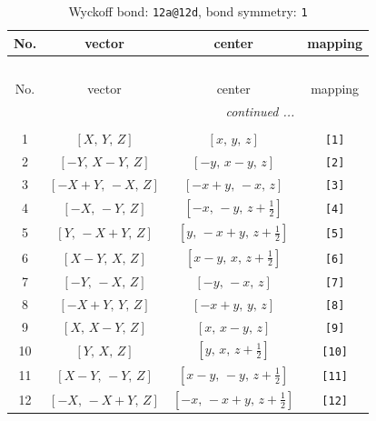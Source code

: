 \documentclass[fleqn,8pt]{jsarticle}
\begin{document}
\renewcommand{\arraystretch}{1.2}
\begin{longtable}{cccc}
\caption{Wyckoff bond: {\tt 12a@12d}, bond symmetry: {\tt 1}}
 \\
 \hline \hline
No. & vector & center & mapping \\ \hline \endfirsthead

\multicolumn{3}{l}{\tablename\ \thetable{}} \\
 \hline \hline
No. & vector & center & mapping \\ \hline \endhead

 \hline \hline
\multicolumn{3}{r}{\footnotesize\it continued ...} \\ \endfoot

 \hline \hline
\multicolumn{3}{r}{} \\ \endlastfoot

1 & $\left[ X,\, Y,\, Z \right]$ & $\left[ x,\, y,\, z \right]$ & {\tt [1]} \\ \hline
2 & $\left[ - Y,\, X - Y,\, Z \right]$ & $\left[ - y,\, x - y,\, z \right]$ & {\tt [2]} \\ \hline
3 & $\left[ - X + Y,\, - X,\, Z \right]$ & $\left[ - x + y,\, - x,\, z \right]$ & {\tt [3]} \\ \hline
4 & $\left[ - X,\, - Y,\, Z \right]$ & $\left[ - x,\, - y,\, z + \frac{1}{2} \right]$ & {\tt [4]} \\ \hline
5 & $\left[ Y,\, - X + Y,\, Z \right]$ & $\left[ y,\, - x + y,\, z + \frac{1}{2} \right]$ & {\tt [5]} \\ \hline
6 & $\left[ X - Y,\, X,\, Z \right]$ & $\left[ x - y,\, x,\, z + \frac{1}{2} \right]$ & {\tt [6]} \\ \hline
7 & $\left[ - Y,\, - X,\, Z \right]$ & $\left[ - y,\, - x,\, z \right]$ & {\tt [7]} \\ \hline
8 & $\left[ - X + Y,\, Y,\, Z \right]$ & $\left[ - x + y,\, y,\, z \right]$ & {\tt [8]} \\ \hline
9 & $\left[ X,\, X - Y,\, Z \right]$ & $\left[ x,\, x - y,\, z \right]$ & {\tt [9]} \\ \hline
10 & $\left[ Y,\, X,\, Z \right]$ & $\left[ y,\, x,\, z + \frac{1}{2} \right]$ & {\tt [10]} \\ \hline
11 & $\left[ X - Y,\, - Y,\, Z \right]$ & $\left[ x - y,\, - y,\, z + \frac{1}{2} \right]$ & {\tt [11]} \\ \hline
12 & $\left[ - X,\, - X + Y,\, Z \right]$ & $\left[ - x,\, - x + y,\, z + \frac{1}{2} \right]$ & {\tt [12]} \\
\end{longtable}
\end{document}
